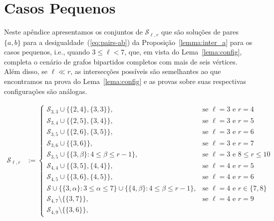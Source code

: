 \documentclass[12pt,a4paper]{book}
\newcommand{\Slr}{\mathcal{S}_{\ell,r}} %
\begin{document}
\appendix
\chapter{Casos Pequenos}\label{cap:app}

Neste apêndice apresentamos os conjuntos de $\Slr$ 
que são soluções de pares $\{a,b\}$ para a desigualdade~(\ref{eq:pairs-ab})
da Proposição~\ref{lemma:inter_a} para os casos pequenos, i.e., quando $3 \leq \ell < 7$, 
que, em vista do Lema~\ref{lema:config}, completa o cenário de grafos bipartidos completos com mais de seis vértices.
%
Além disso, se $\ell \ll r$, as intersecções possíveis são semelhantes ao que encontramos na prova do Lema~\ref{lema:config} e as provas sobre suas respectivas configurações são análogas.  


\begin{equation*}%
    \begin{aligned}
        \mathcal{S}_{\ell, r}
            &:=
    \begin{cases}
        \mathcal{S}_{3,3} \cup \{\{2,4\}, \{3,3\}\}, 
        & \text{se } \ell=3 \text{ e } r=4   \\ 
        \mathcal{S}_{3,4} \cup \{\{2,5\}, \{3,4\}\}, 
        & \text{se } \ell=3 \text{ e } r=5    \\ 
        \mathcal{S}_{3,5} \cup \{\{2,6\}, \{3,5\}\}, 
        & \text{se } \ell=3 \text{ e } r=6    \\ 
         \mathcal{S}_{3,6} \cup \{\{3,6\}\}, 
        & \text{se } \ell=3 \text{ e } r=7    \\ 
        \mathcal{S}_{3,5} \cup \{\{3,\beta\}: 4 \leq \beta \leq r-1\}, & \text{se } \ell =3 \text{ e } 8\leq r \leq 10 \\
         \mathcal{S}_{4,4} \cup \{\{3,5\}, \{4,4\}\}, 
        & \text{se } \ell=4 \text{ e } r=5      \\ 
         \mathcal{S}_{4,5} \cup \{\{3,6\}, \{4,5\}\}, 
        & \text{se } \ell=4 \text{ e } r=6      \\ 
         \mathcal{S} \cup \{\{3,\alpha\}: 3\leq\alpha\leq7\}\cup \{\{4,\beta\}: 4\leq \beta\leq r-1\}, 
        & \text{se } \ell=4 \text{ e } r\in\{7,8\}      \\ 
        \mathcal{S}_{4,7} \setminus\{\{3,7\}\}, 
        & \text{se } \ell=4 \text{ e } r=9      \\ 
         \mathcal{S}_{4,9} \setminus\{\{3,6\}\}, 

\end{cases}
\end{aligned}
\end{equation*}
\end{document}
